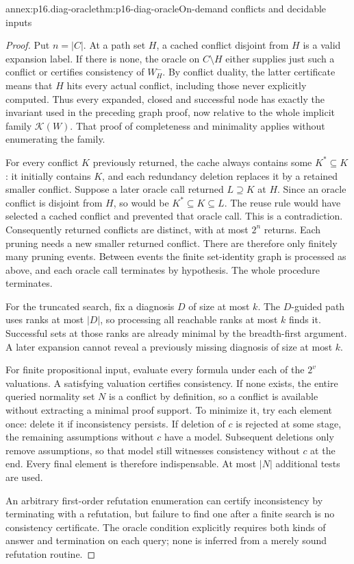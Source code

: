 \begin{annexitem}{annex:p16.diag-oracle}{thm:p16-diag-oracle}{On-demand conflicts and decidable inputs}
\begin{proof}
Put \(n=|C|\).
At a path set \(H\), a cached conflict disjoint from
\(H\) is a valid expansion label. If there is none,
the oracle on \(C\setminus H\) either supplies just
such a conflict or certifies consistency of
\(W^-_H\). By conflict duality, the latter certificate
means that \(H\) hits every actual conflict, including
those never explicitly computed. Thus every expanded,
closed and successful node has exactly the invariant
used in the preceding graph proof, now relative to
the whole implicit family \(\mathcal K(W)\).
That proof of completeness and minimality applies
without enumerating the family.

For every conflict \(K\) previously returned, the cache
always contains some \(K^*\subseteq K\): it initially
contains \(K\), and each redundancy deletion replaces
it by a retained smaller conflict. Suppose a later oracle
call returned \(L\supseteq K\) at \(H\). Since an
oracle conflict is disjoint from \(H\), so would be
\(K^*\subseteq K\subseteq L\). The reuse rule would
have selected a cached conflict and prevented that
oracle call. This is a contradiction.
Consequently returned conflicts are distinct, with at
most \(2^n\) returns. Each pruning needs a new smaller
returned conflict. There are therefore only finitely
many pruning events. Between events the finite
set-identity graph is processed as above, and each
oracle call terminates by hypothesis. The whole
procedure terminates.

For the truncated search, fix a diagnosis \(D\) of
size at most \(k\). The \(D\)-guided path uses ranks
at most \(|D|\), so processing all reachable ranks
at most \(k\) finds it. Successful sets at those ranks
are already minimal by the breadth-first argument.
A later expansion cannot reveal a previously missing
diagnosis of size at most \(k\).

For finite propositional input, evaluate every formula
under each of the \(2^v\) valuations. A satisfying
valuation certifies consistency. If none exists,
the entire queried normality set \(N\) is a conflict
by definition, so a conflict is available without
extracting a minimal proof support. To minimize it,
try each element once: delete it if inconsistency
persists. If deletion of \(c\) is rejected at some
stage, the remaining assumptions without \(c\)
have a model. Subsequent deletions only remove
assumptions, so that model still witnesses consistency
without \(c\) at the end. Every final element is
therefore indispensable. At most \(|N|\) additional
tests are used.

An arbitrary first-order refutation enumeration can
certify inconsistency by terminating with a refutation,
but failure to find one after a finite search is no
consistency certificate. The oracle condition explicitly
requires both kinds of answer and termination on each
query; none is inferred from a merely sound refutation
routine.
\end{proof}
\end{annexitem}

